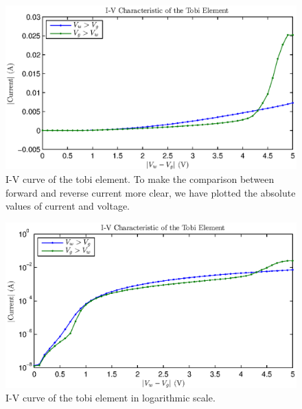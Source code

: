 \begin{figure}[H]
	\center
	\includegraphics{tobi.eps}
	\caption{I-V curve of the tobi element. To make the comparison between forward and reverse current more clear, we have plotted the absolute values of current and voltage.}
	\label{fig:tobi}
\end{figure}

\begin{figure}
	\center
	\includegraphics{tobilog.eps}
	\caption{I-V curve of the tobi element in logarithmic scale.}
	\label{fig:tobilog}
\end{figure}


